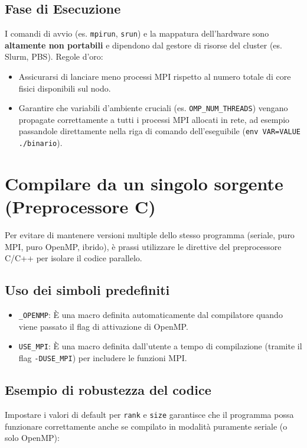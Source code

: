 \subsection*{Fase di Esecuzione}
I comandi di avvio (es. \texttt{mpirun}, \texttt{srun}) e la mappatura dell'hardware sono \textbf{altamente non portabili} e dipendono dal gestore di risorse del cluster (es. Slurm, PBS). Regole d'oro:
\begin{itemize}
    \item Assicurarsi di lanciare meno processi MPI rispetto al numero totale di core fisici disponibili sul nodo.
    \item Garantire che variabili d'ambiente cruciali (es. \texttt{OMP\_NUM\_THREADS}) vengano propagate correttamente a tutti i processi MPI allocati in rete, ad esempio passandole direttamente nella riga di comando dell'eseguibile (\texttt{env VAR=VALUE ./binario}).
\end{itemize}

\section*{Compilare da un singolo sorgente (Preprocessore C)}

Per evitare di mantenere versioni multiple dello stesso programma (seriale, puro MPI, puro OpenMP, ibrido), è prassi utilizzare le direttive del preprocessore C/C++ per isolare il codice parallelo.

\subsection*{Uso dei simboli predefiniti}
\begin{itemize}
    \item \texttt{\_OPENMP}: È una macro definita automaticamente dal compilatore quando viene passato il flag di attivazione di OpenMP.
    \item \texttt{USE\_MPI}: È una macro definita dall'utente a tempo di compilazione (tramite il flag \texttt{-DUSE\_MPI}) per includere le funzioni MPI.
\end{itemize}

\subsection*{Esempio di robustezza del codice}
Impostare i valori di default per \texttt{rank} e \texttt{size} garantisce che il programma possa funzionare correttamente anche se compilato in modalità puramente seriale (o solo OpenMP):

